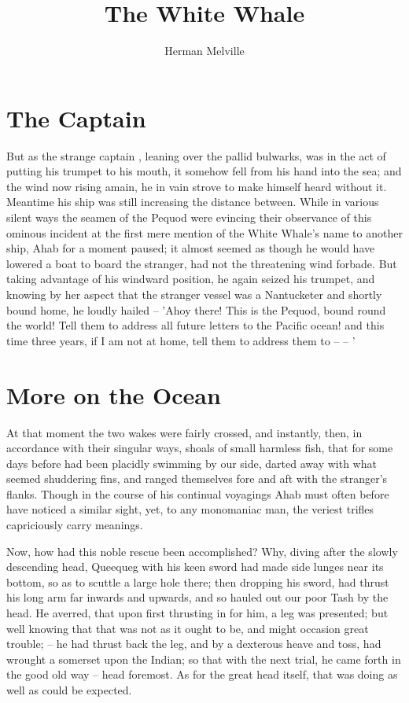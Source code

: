\documentclass{article}
\begin{document}
\title{The White Whale}
\author{Herman Melville}
\maketitle

\section*{The Captain}

But as the strange captain \cite{melville1851moby}, leaning over the pallid bulwarks, was in the act of putting his trumpet to his mouth, it somehow fell from his hand into the sea; and the wind now rising amain, he in vain strove to make himself heard without it. Meantime his ship was still increasing the distance between. While in various silent ways the seamen of the Pequod were evincing their observance of this ominous incident at the first mere mention of the White Whale's name to another ship, Ahab for a moment paused; it almost seemed as though he would have lowered a boat to board the stranger, had not the threatening wind forbade. But taking advantage of his windward position, he again seized his trumpet, and knowing by her aspect that the stranger vessel was a Nantucketer and shortly bound home, he loudly hailed -- 'Ahoy there! This is the Pequod, bound round the world! Tell them to address all future letters to the Pacific ocean! and this time three years, if I am not at home, tell them to address them to -- -- '

\section{More on the Ocean}

   At that moment the two wakes were fairly crossed, and instantly, then, in accordance with their singular ways, shoals of small harmless fish, that for some days before had been placidly swimming by our side, darted away with what seemed shuddering fins, and ranged themselves fore and aft with the stranger's flanks. Though in the course of his continual voyagings Ahab must often before have noticed a similar sight, yet, to any monomaniac man, the veriest trifles capriciously carry meanings. 

Now, how had this noble rescue been accomplished? Why, diving after the slowly descending head, Queequeg with his keen sword had made side lunges near its bottom, so as to scuttle a large hole there; then dropping his sword, had thrust his long arm far inwards and upwards, and so hauled out our poor Tash by the head. He averred, that upon first thrusting in for him, a leg was presented; but well knowing that that was not as it ought to be, and might occasion great trouble; -- he had thrust back the leg, and by a dexterous heave and toss, had wrought a somerset upon the Indian; so that with the next trial, he came forth in the good old way -- head foremost. As for the great head itself, that was doing as well as could be expected.
\end{document}
